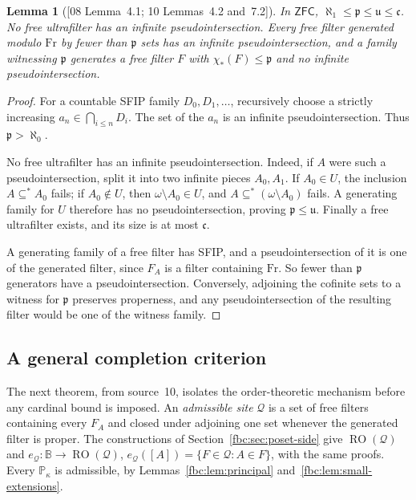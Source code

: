 \documentclass[11pt,letterpaper]{article}
\newtheorem{lemma}[theorem]{Lemma}
\theoremstyle{definition}
\theoremstyle{remark}
\newcommand{\om}{\omega}
\newcommand{\Fr}{\mathrm{Fr}}
\newcommand{\B}{\mathbb B}
\newcommand{\PP}{\mathbb P}
\newcommand{\cp}{\mathfrak p}
\newcommand{\cu}{\mathfrak u}
\newcommand{\cc}{\mathfrak c}
\newcommand{\RO}{\operatorname{RO}}
\newcommand{\cQ}{\mathcal Q}
\newcommand{\ZFC}{\mathsf{ZFC}}
\newcommand{\src}[1]{\textup{[#1]}}
\begin{document}
\begin{lemma}[\src{08 Lemma~4.1; 10 Lemmas~4.2 and~7.2}]
\label{fbc:lem:cardinal-bounds}
In $\ZFC$, $\aleph_1\leq\cp\leq\cu\leq\cc$. No free ultrafilter has an
infinite pseudointersection. Every free filter generated modulo $\Fr$ by
fewer than $\cp$ sets has an infinite pseudointersection, and a family
witnessing $\cp$ generates a free filter $F$ with $\chi_*(F)\leq\cp$ and
no infinite pseudointersection.
\end{lemma}
\begin{proof}
For a countable SFIP family $D_0,D_1,\ldots$, recursively choose a
strictly increasing $a_n\in\bigcap_{i\leq n}D_i$. The set of the
$a_n$ is an infinite pseudointersection. Thus $\cp>\aleph_0$.

No free ultrafilter has an infinite pseudointersection. Indeed, if
$A$ were such a pseudointersection, split it into two infinite pieces
$A_0,A_1$. If $A_0\in U$, the inclusion $A\subseteq^*A_0$ fails;
if $A_0\notin U$, then $\om\setminus A_0\in U$, and
$A\subseteq^*(\om\setminus A_0)$ fails. A generating family for
$U$ therefore has no pseudointersection, proving $\cp\leq\cu$.
Finally a free ultrafilter exists, and its size is at most $\cc$.

A generating family of a free filter has SFIP, and a pseudointersection
of it is one of the generated filter, since $F_A$ is a filter containing
$\Fr$. So fewer than $\cp$ generators have a pseudointersection.
Conversely, adjoining the cofinite sets to a witness for $\cp$ preserves
properness, and any pseudointersection of the resulting filter would be
one of the witness family.
\end{proof}

\subsection{A general completion criterion}
\label{fbc:sec:criterion}
The next theorem, from source~10, isolates the order-theoretic mechanism
before any cardinal bound is imposed. An \emph{admissible site} $\cQ$ is
a set of free filters containing every $F_A$ and closed under adjoining
one set whenever the generated filter is proper. The constructions of
Section~\ref{fbc:sec:poset-side} give $\RO(\cQ)$ and
$e_\cQ:\B\to\RO(\cQ)$, $e_\cQ([A])=\{F\in\cQ:A\in F\}$, with the same
proofs. Every $\PP_\kappa$ is admissible, by
Lemmas~\ref{fbc:lem:principal} and~\ref{fbc:lem:small-extensions}.
\end{document}

